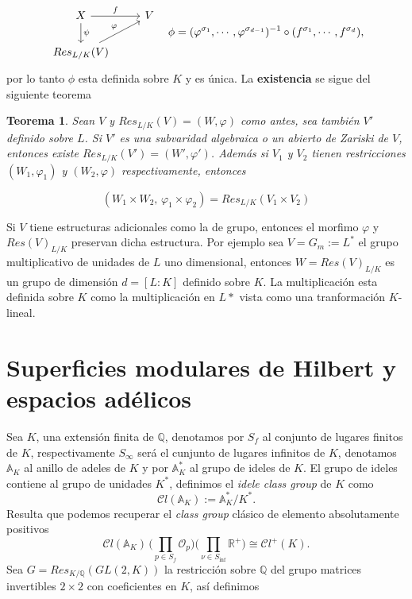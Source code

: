\documentclass[letterpaper]{report}
\newtheorem{teorema}{Teorema}[chapter]
\newcommand{\rac}{\ensuremath{ \mathbb Q }}
\newcommand{\re}{\ensuremath{\mathbb R }}
\newcommand{\Oan}{\ensuremath{\mathcal{O}}}
\newcommand{\Ad}{\ensuremath{\mathbb{A}}}
\begin{document}
\begin{equation}
	\begin{tikzcd}
    	X \arrow{d}{\psi} \arrow{r}{f} & V \\
    	Res_{L/K}(V) \arrow{ur}{\varphi} & {}
	\end{tikzcd}
		\hspace{0.3cm}\phi=(\varphi^{\sigma_1},\cdots,\varphi^{\sigma_{d-1}})^{-1}\circ(f^{\sigma_1},\cdots,f^{\sigma_{d}}),
\end{equation}
\noindent por lo tanto  $\phi$ esta definida sobre $K$ y es única. La \textbf{existencia} se sigue del siguiente teorema

\begin{teorema}
Sean $V$ y $Res_{L/K}(V)=(W,\varphi)$ como antes, sea también $V'$ definido sobre $L$. Si $V'$ es una subvaridad algebraica o un abierto de Zariski de $V$, entonces existe $Res_{L/K}(V')=(W',\varphi')$. Además si $V_1$ y $V_2$ tienen restricciones $(W_1,\varphi_1)$ y $(W_2,\varphi)$ respectivamente, entonces

$$(W_1\times W_2,\,\varphi_1\times\varphi_2)=Res_{L/K}(V_1\times V_2)$$  
\end{teorema}
Si $V$ tiene estructuras adicionales como la de grupo, entonces el morfimo $\varphi$ y $Res(V)_{L/K}$ preservan dicha estructura. Por ejemplo sea $V=G_m:=L^*$ el grupo multiplicativo de unidades de $L$ uno dimensional, entonces $W=Res(V)_{L/K}$ es un grupo de dimensión $d=[L:K]$ definido sobre $K$. La multiplicación esta definida sobre $K$ como la multiplicación en $L*$ vista como una tranformación $K$-lineal.  

\chapter{Superficies modulares de Hilbert y espacios adélicos}
\noindent Sea $K$, una extensión finita de $\rac$, denotamos por $S_f$ al conjunto de lugares finitos de $K$, respectivamente $S_{\infty}$ será el cunjunto de lugares infinitos de $K$, denotamos $\Ad_K$ al anillo de adeles de $K$ y por $\Ad_K^*$ al grupo de ideles de $K$. El grupo de ideles contiene al grupo de unidades $K^*$, definimos el \textit{idele class group} de $K$ como 
\begin{equation}
	\mathcal{C}l(\Ad_K):=\Ad_K^*/K^*.
\end{equation}
Resulta que podemos recuperar el \textit{class group} clásico de elemento absolutamente positivos
$$
	\mathcal{C}l(\Ad_K)\,\Big(\prod_{p\in S_f}\Oan_p\Big)
	\Big(\prod_{\nu\in S_{\inf}}\re^{+}\Big)\cong
	\mathcal{C}l^{+}(K).
$$
Sea $G=Res_{K/\rac}(GL(2,K))$ la restricción sobre $\rac$ del grupo matrices invertibles $2\times2$ con coeficientes en $K$, así definimos 
\end{document}
